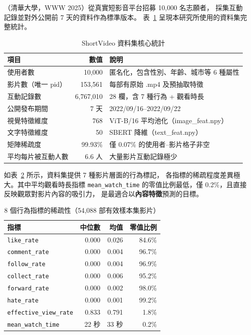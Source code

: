\documentclass[12pt, a4paper]{article}
\begin{document}
\citet{shang2025shortvideo}（清華大學，WWW 2025）從真實短影音平台招募 10,000 名志願者，
採集互動記錄並對外公開前 7 天的資料作為標準版本。
表~\ref{tab:dataset_overview} 呈現本研究所使用的資料集完整統計。

\begin{table}[H]
\centering
\caption{ShortVideo 資料集核心統計}
\label{tab:dataset_overview}
\small
\begin{tabular}{lrl}
\toprule
\textbf{項目} & \textbf{數值} & \textbf{說明} \\
\midrule
使用者數       & 10,000    & 匿名化，包含性別、年齡、城市等 6 種屬性 \\
影片數（唯一 pid）& 153,561  & 每部有原始 .mp4 及預抽取特徵 \\
互動記錄數     & 6,767,010 & 28 欄，含 7 種行為 + 觀看時長 \\
公開發布期間   & 7 天      & 2022/09/16–2022/09/22 \\
視覺特徵維度   & 768       & ViT-B/16 平均池化（image\_feat.npy） \\
文字特徵維度   & 50        & SBERT 降維（text\_feat.npy） \\
矩陣稀疏度     & 99.93\%   & 僅 0.07\% 的使用者–影片格子非空 \\
平均每片被互動人數 & 6.6 人 & 大量影片互動記錄極少 \\
\bottomrule
\end{tabular}
\end{table}

如表~\ref{tab:behavior_sparsity} 所示，資料集提供 7 種影片層面的行為標記，
各指標的稀疏程度差異極大。其中平均觀看時長指標 \texttt{mean\_watch\_time}
的零值比例最低，僅 0.2\%，且直接反映觀眾對影片內容的吸引力，
是最適合以\textbf{內容特徵}預測的目標。

\begin{table}[H]
\centering
\caption{8 個行為指標的稀疏性（54,088 部有效樣本集影片）}
\label{tab:behavior_sparsity}
\small
\begin{tabular}{lrrr}
\toprule
\textbf{指標} & \textbf{中位數} & \textbf{均值} & \textbf{零值比例} \\
\midrule
\texttt{like\_rate}            & 0.000  & 0.026  & 84.6\% \\
\texttt{comment\_rate}         & 0.000  & 0.004  & 96.7\% \\
\texttt{follow\_rate}          & 0.000  & 0.004  & 96.9\% \\
\texttt{collect\_rate}         & 0.000  & 0.006  & 95.2\% \\
\texttt{forward\_rate}         & 0.000  & 0.002  & 98.0\% \\
\texttt{hate\_rate}            & 0.000  & 0.001  & 99.2\% \\
\texttt{effective\_view\_rate} & 0.833  & 0.791  &  1.8\% \\
\texttt{mean\_watch\_time}     & 22 秒  & 33 秒  &  0.2\% \\
\bottomrule
\end{tabular}
\end{table}
\end{document}
